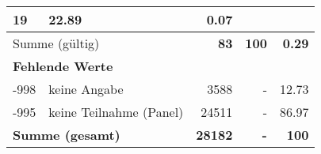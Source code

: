 \begin{longtable}{lXrrr}
       \num{19} &
       \num[round-mode=places,round-precision=2]{22,89} &
         \num[round-mode=places,round-precision=2]{0,07} \\
     \midrule
     \multicolumn{2}{l}{Summe (gültig)} &
       \textbf{\num{83}} &
     \textbf{100} &
       \textbf{\num[round-mode=places,round-precision=2]{0,29}} \\
     \multicolumn{5}{l}{\textbf{Fehlende Werte}}\\
       -998 &
       keine Angabe &
         \num{3588} &
        - &
         \num[round-mode=places,round-precision=2]{12,73} \\
       -995 &
       keine Teilnahme (Panel) &
         \num{24511} &
        - &
         \num[round-mode=places,round-precision=2]{86,97} \\
     \midrule
     \multicolumn{2}{l}{\textbf{Summe (gesamt)}} &
          \textbf{\num{28182}} &
        \textbf{-} &
        \textbf{100} \\
     \bottomrule
     \end{longtable}
     
